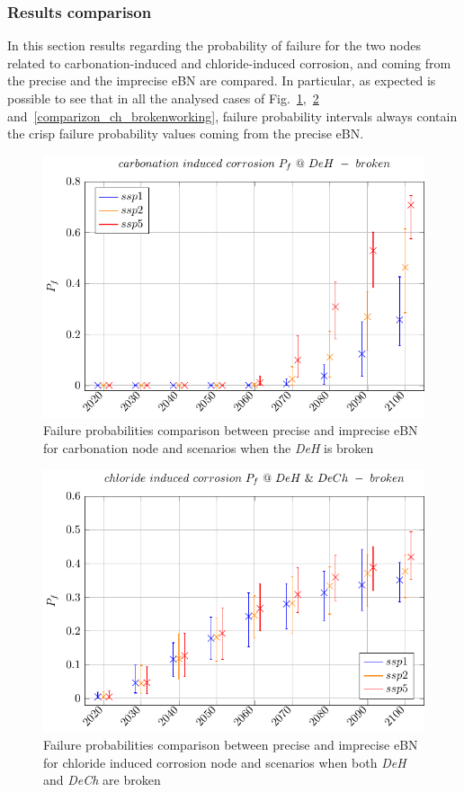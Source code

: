\subsubsection{Results comparison}
In this section results regarding the probability of failure for the two nodes related to carbonation-induced and chloride-induced corrosion, and coming from the precise and the imprecise eBN are compared. 
In particular, as expected is possible to see that in all the analysed cases of Fig.~\ref{comparizon_carb},~\ref{comparizon_ch_brokenbroken} and~\ref{comparizon_ch_brokenworking}, failure probability intervals always contain the crisp failure probability values coming from the precise eBN.
\begin{figure}[H]
    \centering
    \includegraphics[width=\linewidth]{imgs/pdfs/22_carbonation_comparizon_broken.pdf}
    \caption{Failure probabilities comparison between precise and imprecise eBN for carbonation node and scenarios when the \textit{DeH} is broken}\label{comparizon_carb}
\end{figure}

\begin{figure}[H]
    \centering
    \includegraphics[width=\linewidth]{imgs/pdfs/20_Chloride_comparizon_brokenbroken.pdf}
    \caption{Failure probabilities comparison between precise and imprecise eBN for chloride induced corrosion node and scenarios when both \textit{DeH} and \textit{DeCh} are broken}\label{comparizon_ch_brokenbroken}
\end{figure}


